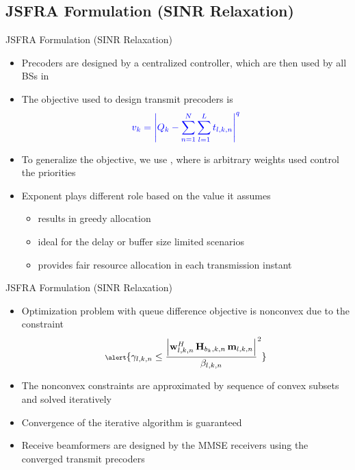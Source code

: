 \documentclass[9pt]{beamer}
\begin{document}
\subsection{\acs{JSFRA} Formulation (\acs{SINR} Relaxation)}

\begin{frame}{\acs{JSFRA} Formulation (\acs{SINR} Relaxation)}
\begin{itemize}
\item Precoders are designed by a centralized controller, which are then used by all \acp{BS} in 
\item The objective used to design transmit precoders is 
\begin{equation}
\scriptsize {\color{blue} v_k = \left | Q_k - \sum_{n = 1}^N \sum_{l = 1}^{L} t_{l,k,n} \right |^q }
\end{equation}
\item To generalize the objective, we use , where  is arbitrary weights used control the priorities
\item Exponent  plays different role based on the value it assumes
	\begin{itemize}
	\item {} results in greedy allocation
	\item {} ideal for the delay or buffer size limited scenarios
	\item {} provides fair resource allocation in each transmission instant
	\end{itemize}
\end{itemize}
\end{frame}

\begin{frame}{\acs{JSFRA} Formulation (\acs{SINR} Relaxation)}
\begin{itemize}
\item Optimization problem with queue difference objective is nonconvex due to the constraint
\begin{equation}  \scriptsize
\alert{\gamma_{l,k,n} \leq \dfrac{\left |\mvec{w}{l,k,n}^H \, \mvec{H}{b_k,k,n} \, \mvec{m}{l,k,n} \right |}{\beta_{l,k,n}}^2 }
\end{equation}
\item The nonconvex constraints are approximated by sequence of convex subsets and solved iteratively
\item Convergence of the iterative algorithm is guaranteed
\item Receive beamformers are designed by the \acs{MMSE} receivers using the converged transmit precoders
\end{itemize}
\end{frame}
\end{document}
